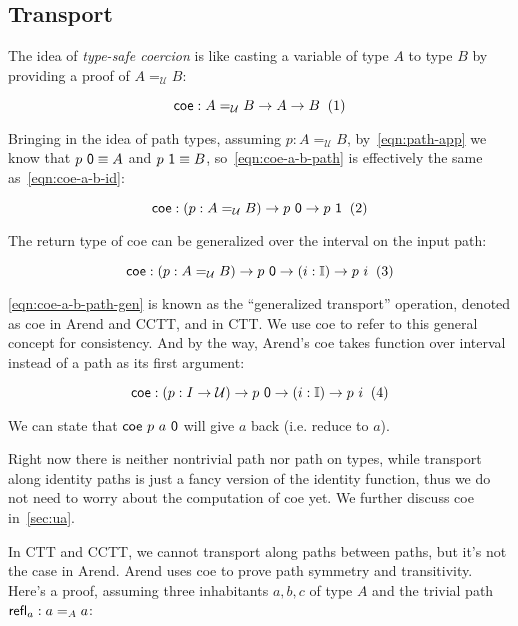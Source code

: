 \subsection{Transport}
\label{subsec:coe}

The idea of \textit{type-safe coercion} is like
casting a variable of type $A$ to type $B$ by providing a proof
of $A =_{\mathcal U} B$:

\[
  \textsf{coe} : A =_{\mathcal U} B \rightarrow A \rightarrow B
  \xtag \label{eqn:coe-a-b-id}
\]

Bringing in the idea of path types,
assuming $p : A =_{\mathcal U} B$, by~\ref{eqn:path-app}
we know that $p~\textsf 0 \equiv A$ and
$p~\textsf 1 \equiv B$,
so~\ref{eqn:coe-a-b-path} is effectively the same
as~\ref{eqn:coe-a-b-id}:

\[
  \textsf{coe} : (p : A =_{\mathcal U} B) \rightarrow p~\textsf 0
  \rightarrow p~\textsf 1
  \xtag \label{eqn:coe-a-b-path}
\]

The return type of \textsf{coe} can be generalized over
the interval on the input path:

\[
  \textsf{coe} : (p : A =_{\mathcal U} B) \rightarrow p~\textsf 0
  \rightarrow (i : \mathbb I) \rightarrow p~i
  \xtag \label{eqn:coe-a-b-path-gen}
\]

\ref{eqn:coe-a-b-path-gen} is known as the ``generalized transport''
operation, denoted as \textsf{coe} in Arend and CCTT,
and  in CTT.
We use \textsf{coe} to refer to this general concept for consistency.
And by the way,
Arend's \textsf{coe} takes function over interval instead
of a path as its first argument:

\[
  \textsf{coe} : (p : I \rightarrow \mathcal U)
  \rightarrow p~\textsf 0
  \rightarrow (i : \mathbb I) \rightarrow p~i
  \xtag
\]

We can state that $\textsf{coe}~p~a~\textsf 0$ will give $a$ back
(i.e. reduce to $a$).

Right now there is neither nontrivial path nor path on types,
while transport along identity paths is just a fancy version
of the identity function, thus we do not need to worry about the
computation of \textsf{coe} yet.
We further discuss \textsf{coe} in~\cref{sec:ua}.

In CTT and CCTT, we cannot transport along paths between paths,
but it's not the case in Arend.
Arend uses \textsf{coe} to prove path symmetry and transitivity.
Here's a proof, assuming three inhabitants $a, b, c$ of type $A$
and the trivial path $\textsf{refl}_a : a =_A a$:

